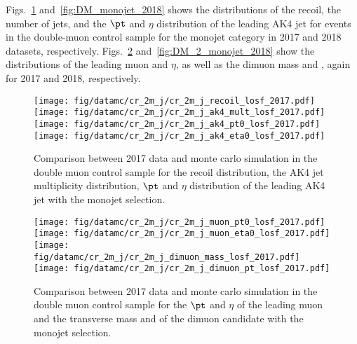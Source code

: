 Figs.~\ref{fig:DM_monojet_2017} and~\ref{fig:DM_monojet_2018} shows the distributions of the recoil, the number of jets, and the $\pt$ and $\eta$ distribution of the leading AK4  jet
for events in the double-muon control sample for the monojet category in 2017 and 2018 datasets, respectively. Figs.~\ref{fig:DM_2_monojet_2017} and~\ref{fig:DM_2_monojet_2018} show the distributions of the leading muon \pt and $\eta$, as well as the dimuon mass and \pt, again for 2017 and 2018, respectively.

\begin{figure}[htbp]
    \begin{center}
        \texttt{[image: fig/datamc/cr\_2m\_j/cr\_2m\_j\_recoil\_losf\_2017.pdf]}
        \texttt{[image: fig/datamc/cr\_2m\_j/cr\_2m\_j\_ak4\_mult\_losf\_2017.pdf]} \\
        \texttt{[image: fig/datamc/cr\_2m\_j/cr\_2m\_j\_ak4\_pt0\_losf\_2017.pdf]}
        \texttt{[image: fig/datamc/cr\_2m\_j/cr\_2m\_j\_ak4\_eta0\_losf\_2017.pdf]}
    \end{center}
    \caption{Comparison between 2017 data and monte carlo simulation in the double muon control sample for
        the recoil distribution, the AK4 jet multiplicity distribution,  $\pt$ and $\eta$ distribution
        of the leading AK4  jet with the monojet selection.}
    \label{fig:DM_monojet_2017}
\end{figure}

\begin{figure}[htbp]
    \begin{center}
        \texttt{[image: fig/datamc/cr\_2m\_j/cr\_2m\_j\_muon\_pt0\_losf\_2017.pdf]}
        \texttt{[image: fig/datamc/cr\_2m\_j/cr\_2m\_j\_muon\_eta0\_losf\_2017.pdf]} \\
        \texttt{[image: fig/datamc/cr\_2m\_j/cr\_2m\_j\_dimuon\_mass\_losf\_2017.pdf]}
        \texttt{[image: fig/datamc/cr\_2m\_j/cr\_2m\_j\_dimuon\_pt\_losf\_2017.pdf]}
    \end{center}
    \caption{Comparison between 2017 data and monte carlo simulation in the double muon control sample for
        the $\pt$ and $\eta$ of the leading muon and the transverse mass and \pt of the dimuon candidate with the monojet selection.}
    \label{fig:DM_2_monojet_2017}
\end{figure}

